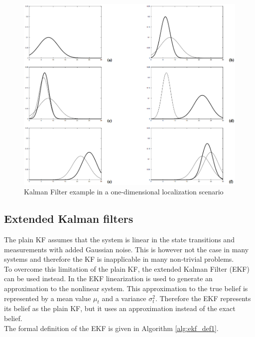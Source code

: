 \begin{figure}[H]
\centering
\includegraphics[scale=0.45]{images/KalmanFilterExample}
\caption{Kalman Filter example in a one-dimensional localization scenario}
\label{fig:kf_ex}
\end{figure}

\subsection{Extended Kalman filters}

The plain KF assumes that the system is linear in the state transitions and measurements with added Gaussian noise. This is however not the case in many systems and therefore the KF is inapplicable in many non-trivial problems.\\

To overcome this limitation of the plain KF, the extended Kalman Filter (EKF) can be used instead. In the EKF linearization is used to generate an approximation to the nonlinear system. This approximation to the true belief is represented by a mean value $\mu_t$ and a variance $\sigma_t^2$. Therefore the EKF represents its belief as the plain KF, but it uses an approximation instead of the exact belief.\\

The formal definition of the EKF is given in Algorithm \ref{alg:ekf_def1}.


